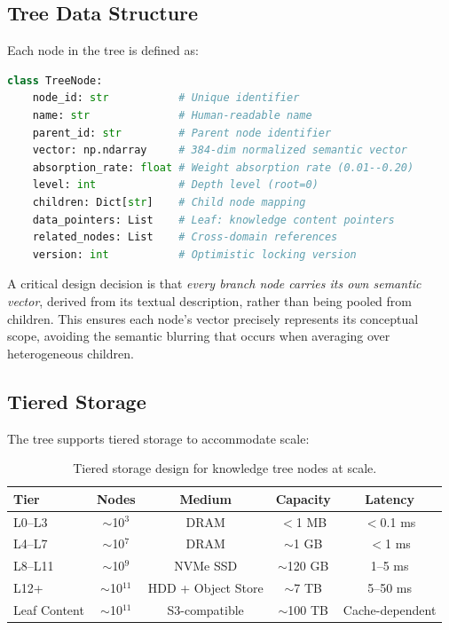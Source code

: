 \documentclass[11pt,a4paper]{article}
\begin{document}
\subsection{Tree Data Structure}

Each node in the tree is defined as:

\begin{lstlisting}[language=Python, caption=TreeNode data structure, label=lst:node]
class TreeNode:
    node_id: str           # Unique identifier
    name: str              # Human-readable name
    parent_id: str         # Parent node identifier
    vector: np.ndarray     # 384-dim normalized semantic vector
    absorption_rate: float # Weight absorption rate (0.01--0.20)
    level: int             # Depth level (root=0)
    children: Dict[str]    # Child node mapping
    data_pointers: List    # Leaf: knowledge content pointers
    related_nodes: List    # Cross-domain references
    version: int           # Optimistic locking version
\end{lstlisting}

A critical design decision is that \textit{every branch node carries its own semantic vector}, derived from its textual description, rather than being pooled from children. This ensures each node's vector precisely represents its conceptual scope, avoiding the semantic blurring that occurs when averaging over heterogeneous children.

\subsection{Tiered Storage}

The tree supports tiered storage to accommodate scale:

\begin{table}[H]
\centering
\caption{Tiered storage design for knowledge tree nodes at scale.}
\label{tab:tiered}
\begin{tabular}{lcccc}
\toprule
\textbf{Tier} & \textbf{Nodes} & \textbf{Medium} & \textbf{Capacity} & \textbf{Latency} \\
\midrule
L0--L3       & $\sim$10$^3$ & DRAM & $<$1 MB & $<$0.1 ms \\
L4--L7       & $\sim$10$^7$ & DRAM & $\sim$1 GB & $<$1 ms \\
L8--L11      & $\sim$10$^9$ & NVMe SSD & $\sim$120 GB & 1--5 ms \\
L12+         & $\sim$10$^{11}$ & HDD + Object Store & $\sim$7 TB & 5--50 ms \\
Leaf Content & $\sim$10$^{11}$ & S3-compatible & $\sim$100 TB & Cache-dependent \\
\bottomrule
\end{tabular}
\end{table}
\end{document}
